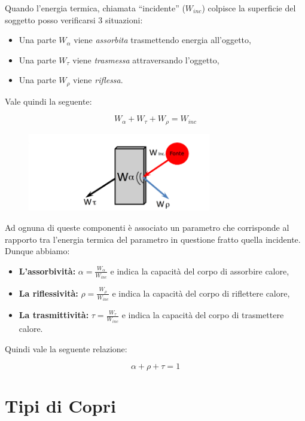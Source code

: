 Quando l'energia termica, chiamata “incidente” ($W_{inc}$) colpisce la
superficie del soggetto posso verificarsi 3 situazioni:

\begin{itemize}
    \item Una parte $W_\alpha$ viene \textit{assorbita} trasmettendo energia all'oggetto,
    \item Una parte $W_\tau$ viene \textit{trasmessa} attraversando l'oggetto,
    \item Una parte $W_\rho$ viene \textit{riflessa}.
\end{itemize}

Vale quindi la seguente:

$$
    W_\alpha + W_\tau + W_\rho = W_{inc}
$$

\begin{figure}[H]
    \centering
    \includegraphics[width=8cm, keepaspectratio]{capitoli/immagini/imgs/termocamera.png}
\end{figure}

Ad ognuna di queste componenti è associato un parametro che corrisponde al
rapporto tra l'energia termica del parametro in questione fratto quella incidente.
Dunque abbiamo:

\begin{itemize}
    \item \textbf{L'assorbività:} $\alpha = \frac{W_\alpha}{W_{inc}}$ e indica la
          capacità del corpo di assorbire calore,
    \item \textbf{La riflessività:} $\rho = \frac{W_\rho}{W_{inc}}$ e indica la capacità
          del corpo di riflettere calore,
    \item \textbf{La trasmittività:} $\tau = \frac{W_\tau}{W_{inc}}$ e indica
          la capacità del corpo di trasmettere calore.
\end{itemize}

Quindi vale la seguente relazione:

$$
    \alpha + \rho + \tau = 1
$$

\section{Tipi di Copri}

